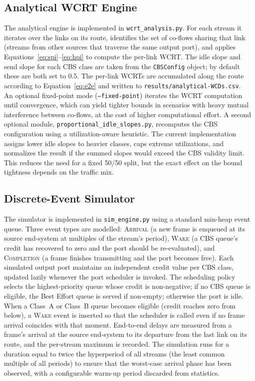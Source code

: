 \documentclass[11pt,a4paper]{article}
\begin{document}
\subsection{Analytical WCRT Engine}

The analytical engine is implemented in \texttt{wcrt\_analysis.py}.
For each stream it iterates over the links on its route, identifies the set
of co-flows sharing that link (streams from other sources that traverse the
same output port), and applies Equations~\eqref{eq:spi}--\eqref{eq:hpi}
to compute the per-link WCRT.
The idle slope and send slope for each CBS class are taken from the
\texttt{CBSConfig} object; by default these are both set to 0.5.
The per-link WCRTs are accumulated along the route according to
Equation~\eqref{eq:e2e} and written to \texttt{results/analytical-WCDs.csv}.
An optional fixed-point mode (\texttt{--fixed-point}) iterates the WCRT
computation until convergence, which can yield tighter bounds in scenarios
with heavy mutual interference between co-flows, at the cost of higher
computational effort.
A second optional module, \texttt{proportional\_idle\_slopes.py},
recomputes the CBS configuration using a utilization-aware heuristic.
The current implementation assigns lower idle slopes to heavier classes,
caps extreme utilizations, and normalizes the result if the summed slopes
would exceed the CBS validity limit.
This reduces the need for a fixed 50/50 split, but the exact effect on the
bound tightness depends on the traffic mix.

\subsection{Discrete-Event Simulator}

The simulator is implemented in \texttt{sim\_engine.py} using a standard
min-heap event queue.
Three event types are modelled: \textsc{Arrival} (a new frame is enqueued
at its source end-system at multiples of the stream's period),
\textsc{Wake} (a CBS queue's credit has recovered to zero and the port
should be re-evaluated), and \textsc{Completion} (a frame finishes
transmitting and the port becomes free).
Each simulated output port maintains an independent credit value per CBS
class, updated lazily whenever the port scheduler is invoked.
The scheduling policy selects the highest-priority queue whose credit is
non-negative; if no CBS queue is eligible, the Best Effort queue is served
if non-empty; otherwise the port is idle.
When a Class~A or Class~B queue becomes eligible (credit reaches zero from
below), a \textsc{Wake} event is inserted so that the scheduler is called
even if no frame arrival coincides with that moment.
End-to-end delays are measured from a frame's arrival at the source
end-system to its departure from the last link on its route, and the
per-stream maximum is recorded.
The simulation runs for a duration equal to twice the hyperperiod of all
streams (the least common multiple of all periods) to ensure that the
worst-case arrival phase has been observed, with a configurable warm-up
period discarded from statistics.
\end{document}
